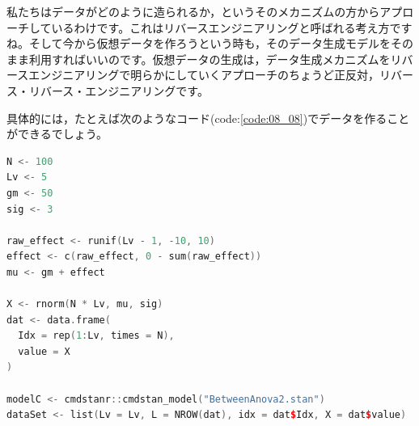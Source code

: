 \documentclass{ltjsbook}
\begin{document}
私たちはデータがどのように造られるか，というそのメカニズムの方からアプローチしているわけです。これはリバースエンジニアリングと呼ばれる考え方ですね。そして今から仮想データを作ろうという時も，そのデータ生成モデルをそのまま利用すればいいのです。仮想データの生成は，データ生成メカニズムをリバースエンジニアリングで明らかにしていくアプローチのちょうど正反対，リバース・リバース・エンジニアリングです。

具体的には，たとえば次のようなコード(code:\ref{code:08_08})でデータを作ることができるでしょう。
\begin{lstlisting}[language=c++,label={code:08_08},caption={リバースエンジニアリング}]
N <- 100
Lv <- 5
gm <- 50
sig <- 3

raw_effect <- runif(Lv - 1, -10, 10)
effect <- c(raw_effect, 0 - sum(raw_effect))
mu <- gm + effect

X <- rnorm(N * Lv, mu, sig)
dat <- data.frame(
  Idx = rep(1:Lv, times = N),
  value = X
)

modelC <- cmdstanr::cmdstan_model("BetweenAnova2.stan")
dataSet <- list(Lv = Lv, L = NROW(dat), idx = dat$Idx, X = dat$value)
\end{lstlisting}
\end{document}
